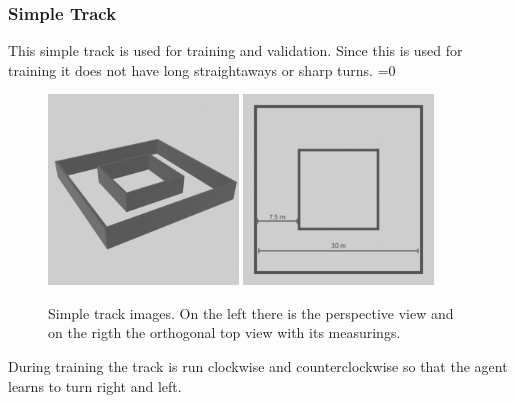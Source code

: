 \documentclass[14pt]{extarticle}
\newcounter{debug}
\begin{document}
\begin{flushleft}
	\subsubsection{Simple Track}
	This simple track is used for training and validation. Since this is used for training it does not have long straightaways or sharp turns.
	\ifnum\value{debug}=0 {
	\begin{figure}[H]
    		\centering\includegraphics[width=0.45\textwidth]{./Image/Environment/Easy/perspective.png}
    		\centering\includegraphics[width=0.45\textwidth]{./Image/Environment/Easy/top_mod.png}
		\vspace{5mm}
		\caption{Simple track images. On the left there is the perspective view and on the rigth the orthogonal top view with its measurings.}
	\end{figure}
	}\fi
	During training the track is run clockwise and counterclockwise so that the agent learns to turn right and left.
	

\end{flushleft}
\end{document}
